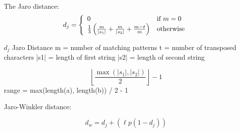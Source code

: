 The Jaro distance:
\begin{equation}
  d_j = \left\{
  \begin{array}{l l}
    0 & \text{if }m = 0 \\ 
    \frac{1}{3}\left(\frac{m}{|s_1|} + \frac{m}{|s_2|} + \frac{m-t}{m}\right) & \text{otherwise} \end{array} \right.
\end{equation}

$ d_j $ Jaro Distance
m = number of matching patterns
t = number of transposed characters
|s1| = length of first string
|s2| = length of second string

\begin{equation}
  \left\lfloor\frac{\max(|s_1|,|s_2|)}{2}\right\rfloor-1
\end{equation}
range = max(length(a), length(b)) / 2 - 1


Jaro-Winkler distance:

\begin{equation}
  d_w = d_j + (\ell p (1 - d_j))
\end{equation}


